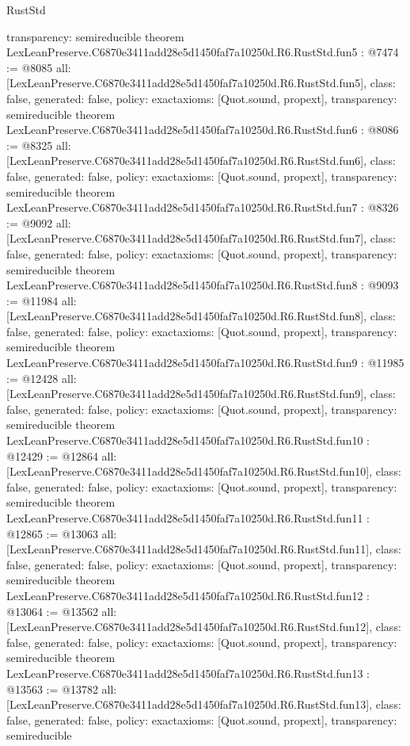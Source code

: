\begin{lexlean}{RustStd}
\begin{coremodule}
{  transparency: semireducible
}
theorem LexLeanPreserve.C6870e3411add28e5d1450faf7a10250d.R6.RustStd.fun5 : @7474 := @8085 {
  all: [LexLeanPreserve.C6870e3411add28e5d1450faf7a10250d.R6.RustStd.fun5],
  class: false,
  generated: false,
  policy: exact{axioms: [Quot.sound, propext]},
  transparency: semireducible
}
theorem LexLeanPreserve.C6870e3411add28e5d1450faf7a10250d.R6.RustStd.fun6 : @8086 := @8325 {
  all: [LexLeanPreserve.C6870e3411add28e5d1450faf7a10250d.R6.RustStd.fun6],
  class: false,
  generated: false,
  policy: exact{axioms: [Quot.sound, propext]},
  transparency: semireducible
}
theorem LexLeanPreserve.C6870e3411add28e5d1450faf7a10250d.R6.RustStd.fun7 : @8326 := @9092 {
  all: [LexLeanPreserve.C6870e3411add28e5d1450faf7a10250d.R6.RustStd.fun7],
  class: false,
  generated: false,
  policy: exact{axioms: [Quot.sound, propext]},
  transparency: semireducible
}
theorem LexLeanPreserve.C6870e3411add28e5d1450faf7a10250d.R6.RustStd.fun8 : @9093 := @11984 {
  all: [LexLeanPreserve.C6870e3411add28e5d1450faf7a10250d.R6.RustStd.fun8],
  class: false,
  generated: false,
  policy: exact{axioms: [Quot.sound, propext]},
  transparency: semireducible
}
theorem LexLeanPreserve.C6870e3411add28e5d1450faf7a10250d.R6.RustStd.fun9 : @11985 := @12428 {
  all: [LexLeanPreserve.C6870e3411add28e5d1450faf7a10250d.R6.RustStd.fun9],
  class: false,
  generated: false,
  policy: exact{axioms: [Quot.sound, propext]},
  transparency: semireducible
}
theorem LexLeanPreserve.C6870e3411add28e5d1450faf7a10250d.R6.RustStd.fun10 : @12429 := @12864 {
  all: [LexLeanPreserve.C6870e3411add28e5d1450faf7a10250d.R6.RustStd.fun10],
  class: false,
  generated: false,
  policy: exact{axioms: [Quot.sound, propext]},
  transparency: semireducible
}
theorem LexLeanPreserve.C6870e3411add28e5d1450faf7a10250d.R6.RustStd.fun11 : @12865 := @13063 {
  all: [LexLeanPreserve.C6870e3411add28e5d1450faf7a10250d.R6.RustStd.fun11],
  class: false,
  generated: false,
  policy: exact{axioms: [Quot.sound, propext]},
  transparency: semireducible
}
theorem LexLeanPreserve.C6870e3411add28e5d1450faf7a10250d.R6.RustStd.fun12 : @13064 := @13562 {
  all: [LexLeanPreserve.C6870e3411add28e5d1450faf7a10250d.R6.RustStd.fun12],
  class: false,
  generated: false,
  policy: exact{axioms: [Quot.sound, propext]},
  transparency: semireducible
}
theorem LexLeanPreserve.C6870e3411add28e5d1450faf7a10250d.R6.RustStd.fun13 : @13563 := @13782 {
  all: [LexLeanPreserve.C6870e3411add28e5d1450faf7a10250d.R6.RustStd.fun13],
  class: false,
  generated: false,
  policy: exact{axioms: [Quot.sound, propext]},
  transparency: semireducible
}
\end{coremodule}
\end{lexlean}
